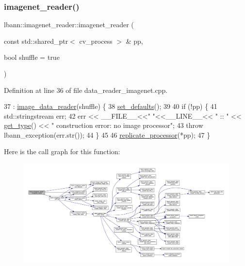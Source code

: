 \subsubsection{\texorpdfstring{imagenet\+\_\+reader()}{imagenet\_reader()}\hspace{0.1cm}{\footnotesize\ttfamily [2/3]}}
{\footnotesize\ttfamily lbann\+::imagenet\+\_\+reader\+::imagenet\+\_\+reader (\begin{DoxyParamCaption}\item[{const std\+::shared\+\_\+ptr$<$ cv\+\_\+process $>$ \&}]{pp,  }\item[{bool}]{shuffle = {\ttfamily true} }\end{DoxyParamCaption})}



Definition at line 36 of file data\+\_\+reader\+\_\+imagenet.\+cpp.


\begin{DoxyCode}
37   : \hyperlink{classlbann_1_1image__data__reader_a582185ab03c4643117fd93e0ba843882}{image\_data\_reader}(shuffle) \{
38   \hyperlink{classlbann_1_1imagenet__reader_ad1e108315d659509a3e166c2f8a4941f}{set\_defaults}();
39 
40   \textcolor{keywordflow}{if} (!pp) \{
41     std::stringstream err;
42     err << \_\_FILE\_\_<<\textcolor{stringliteral}{" "}<<\_\_LINE\_\_<< \textcolor{stringliteral}{" :: "} << \hyperlink{classlbann_1_1imagenet__reader_a0afea0db8b4286b56211842f8f1d7678}{get\_type}() << \textcolor{stringliteral}{" construction error: no image
       processor"};
43     \textcolor{keywordflow}{throw} lbann\_exception(err.str());
44   \}
45 
46   \hyperlink{classlbann_1_1imagenet__reader_a1b642b5eb01b209e72bdd8dfa139cafd}{replicate\_processor}(*pp);
47 \}
\end{DoxyCode}
Here is the call graph for this function\+:\nopagebreak
\begin{figure}[H]
\begin{center}
\leavevmode
\includegraphics[width=350pt]{classlbann_1_1imagenet__reader_abf46c9cf51a7e046173a0046fb0ad08a_cgraph}
\end{center}
\end{figure}
\mbox{\label{classlbann_1_1imagenet__reader_a18939cd7962491c30dc857622bad9666}} 
